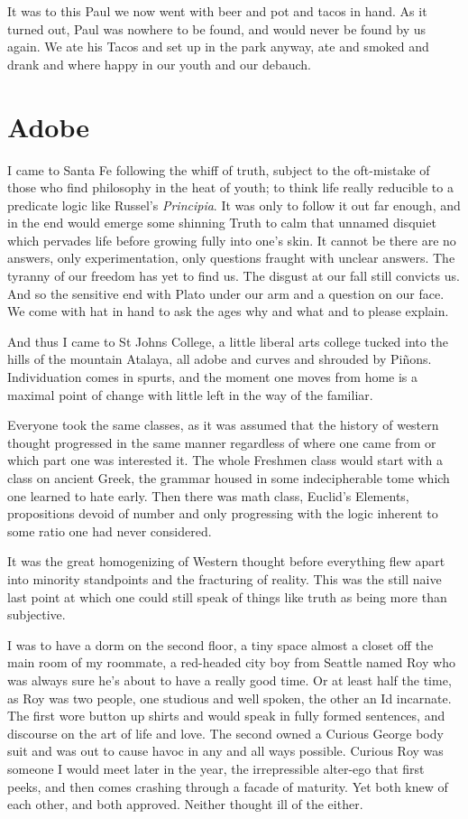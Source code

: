 \documentclass[ebook, 10pt, openright, onecolumn]{memoir}
\newcommand*\td[1]{
  \todo[inline]{
     #1 
  }
}
\newcommand*\finish{\td{ ----- Finish this section -----}}
\begin{document}
It was to this Paul we now went with beer and pot and tacos in hand.  As it
turned out, Paul was nowhere to be found, and would never be found by us again.
We ate his Tacos and set up in the park anyway, ate and smoked and drank and
where happy in our youth and our debauch.

\chapter{Adobe}
\label{cha:adobe}

I came to Santa Fe following the whiff of truth, subject to the oft-mistake of
those who find philosophy in the heat of youth; to think life really reducible
to a predicate logic like Russel's \textit{Principia}. It was only to follow it
out far enough, and in the end would emerge some shinning Truth to calm that
unnamed disquiet which pervades life before growing fully into one's skin.  It
cannot be there are no answers, only experimentation, only questions fraught
with unclear answers.  The tyranny of our freedom has yet to find us.  The
disgust at our fall still convicts us.  And so the sensitive end with Plato
under our arm and a question on our face.  We come with hat in hand to ask the
ages why and what and to please explain.

And thus I came to St Johns College, a little liberal arts college tucked into
the hills of the mountain Atalaya, all adobe and curves and shrouded by Piñons.
Individuation comes in spurts, and the moment one moves from home is a maximal
point of change with little left in the way of the familiar.

Everyone took the same classes, as it was assumed that the history of western
thought progressed in the same manner regardless of where one came from or which
part one was interested it.  The whole Freshmen class would start with a class
on ancient Greek, the grammar housed in some indecipherable tome which one
learned to hate early.  Then there was math class, Euclid's Elements,
propositions devoid of number and only progressing with the logic inherent to
some ratio one had never considered.

It was the great homogenizing of Western thought before everything flew apart
into minority standpoints and the fracturing of reality.  This was the still
naive last point at which one could still speak of things like truth as being
more than subjective.
\finish

I was to have a dorm on the second floor, a tiny space almost a closet off the
main room of my roommate, a red-headed city boy from Seattle named Roy who was
always sure he's about to have a really good time.  Or at least half the time,
as Roy was two people, one studious and well spoken, the other an Id incarnate.
The first wore button up shirts and would speak in fully formed sentences, and
discourse on the art of life and love.  The second owned a Curious George body
suit and was out to cause havoc in any and all ways possible.  Curious Roy was
someone I would meet later in the year, the irrepressible alter-ego that first
peeks, and then comes crashing through a facade of maturity.  Yet both knew of
each other, and both approved.  Neither thought ill of the either.
\end{document}
